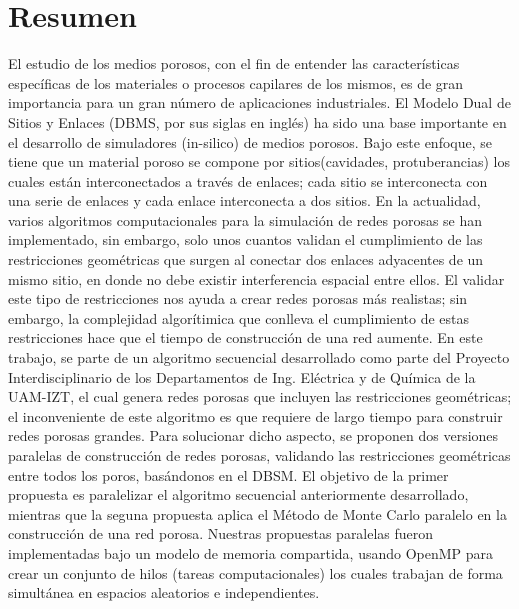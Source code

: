 \chapter{Resumen}
\bigskip
\barra
\bigskip
El estudio de los medios porosos, con el fin de entender las caracter\'isticas espec\'ificas de los materiales o procesos capilares de los mismos, es de gran importancia para un gran n\'umero de aplicaciones industriales. El Modelo Dual de Sitios y Enlaces (DBMS, por sus siglas en ingl\'es) ha sido una base importante en el desarrollo de simuladores (in-silico) de medios porosos. Bajo este enfoque, se tiene que un material poroso se compone por sitios(cavidades, protuberancias) los cuales est\'an interconectados a trav\'es de enlaces; cada sitio se interconecta con una serie de enlaces y cada enlace interconecta a dos sitios. En la actualidad, varios algoritmos computacionales para la simulaci\'on de redes porosas se han implementado, sin embargo, solo unos cuantos validan el cumplimiento de las restricciones geom\'etricas que surgen al conectar dos enlaces adyacentes de un mismo sitio, en donde no debe existir interferencia espacial entre ellos. El validar este tipo de restricciones nos ayuda a crear redes porosas m\'as realistas; sin embargo, la complejidad algor\'itimica que conlleva el cumplimiento de estas restricciones hace que el tiempo de construcci\'on de una red aumente. En este trabajo, se parte de un algoritmo secuencial desarrollado como parte del Proyecto Interdisciplinario de los Departamentos de Ing. El\'ectrica y de Qu\'imica de la UAM-IZT, el cual genera redes porosas que incluyen las restricciones geom\'etricas; el inconveniente de este algoritmo es que requiere de largo tiempo para construir redes porosas grandes. Para solucionar dicho aspecto, se proponen dos versiones paralelas de construcci\'on de redes porosas, validando las restricciones geom\'etricas entre todos los poros, bas\'andonos en el DBSM. El objetivo de la primer propuesta es paralelizar el algoritmo secuencial anteriormente desarrollado, mientras que la seguna propuesta aplica el M\'etodo de Monte Carlo paralelo en la construcci\'on de una red porosa.  Nuestras propuestas paralelas fueron implementadas bajo un modelo de memoria compartida, usando OpenMP para crear un conjunto de hilos (tareas computacionales) los cuales trabajan de forma simult\'anea en espacios aleatorios e independientes.
